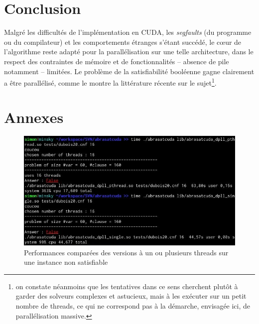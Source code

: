 \documentclass{article}
\newcommand{\cuda}{\textsc{CUDA}}
\begin{document}
\section{Conclusion}
Malgré les difficultés de l'implémentation en \cuda, les \emph{segfaults} (du programme ou du compilateur) et les comportements étranges s'étant succédé, le cœur de l'algorithme reste adapté pour la parallélisation sur une telle architecture, dans le respect des contraintes de mémoire et de fonctionnalités -- absence de pile notamment -- limitées. Le problème de la satisfiabilité booléenne gagne clairement a être parallélisé, comme le montre la littérature récente sur le sujet\footnote{on constate néanmoins que les tentatives dans ce sens cherchent plutôt à garder des solveurs complexes et astucieux, mais à les exécuter sur un petit nombre de threads, ce qui ne correspond pas à la démarche, envisagée ici, de parallélisation massive.}.

\section{Annexes}

\begin{figure}[hp]
\includegraphics[width = 1.0\textwidth]{./benchmark.jpg}
  \caption[mono-threadé]{Performances comparées des versions à un ou plusieurs threads sur une instance non satisfiable}
  \label{benchmark}
\end{figure}
\end{document}
